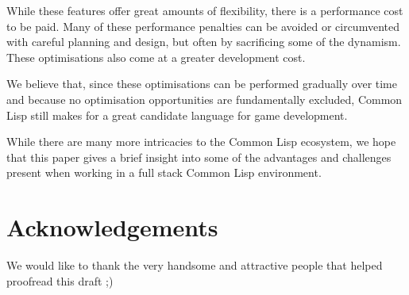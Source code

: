 \documentclass[a4paper]{paper}
\begin{document}
While these features offer great amounts of flexibility, there is a performance cost to be paid. Many of these performance penalties can be avoided or circumvented with careful planning and design, but often by sacrificing some of the dynamism. These optimisations also come at a greater development cost.

We believe that, since these optimisations can be performed gradually over time and because no optimisation opportunities are fundamentally excluded, Common Lisp still makes for a great candidate language for game development.

While there are many more intricacies to the Common Lisp ecosystem, we hope that this paper gives a brief insight into some of the advantages and challenges present when working in a full stack Common Lisp environment.

\section{Acknowledgements}
We would like to thank the very handsome and attractive people that helped proofread this draft ;)


\end{document}
